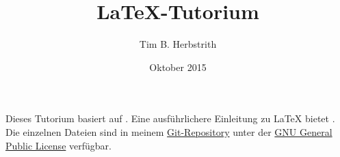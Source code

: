 \documentclass[a4paper]{article}
\author{Tim B. Herbstrith}
\title{\LaTeX-Tutorium}
\date{Oktober 2015}
\begin{document}
	\maketitle
	
	Dieses Tutorium basiert auf \cite{l2short}.
	Eine ausführlichere Einleitung zu \LaTeX{} bietet \cite{texbuch}.\\
	
	Die einzelnen Dateien sind in meinem
	\href{https://github.com/tim6her/BAS1}{Git-Repository}
	unter der 
	\href{http://www.gnu.org/licenses/gpl.html}{GNU General Public License}
	verfügbar.
	
	\printbibliography
\end{document}
